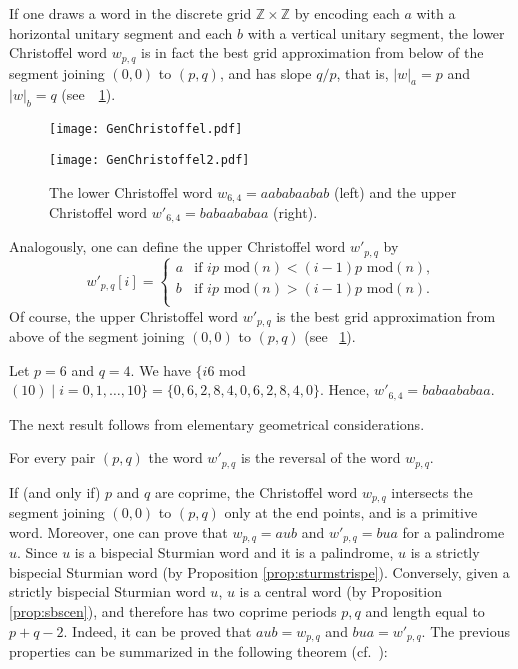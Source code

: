 \documentclass{llncs}
\begin{document}
If one draws a word in the discrete grid $\mathbb{Z} \times \mathbb{Z}$ by encoding each $a$ with a horizontal unitary segment and each $b$ with a vertical unitary segment, the lower Christoffel word $w_{p,q}$ is in fact the best grid approximation from below of the segment joining $(0,0)$ to $(p,q)$, and has slope $q/p$, that is, $|w|_{a}=p$ and  $|w|_{b}=q$ (see~\figurename~\ref{fig:GC}).

\begin{figure}
\begin{center}
\begin{minipage}{5.7cm}
\texttt{[image: GenChristoffel.pdf]}
\end{minipage}
\begin{minipage}{5.7cm}
\texttt{[image: GenChristoffel2.pdf]}
\end{minipage}
\end{center}
\caption{The lower Christoffel word $w_{6,4}=aababaabab$ (left) and the upper Christoffel word $w'_{6,4}=babaababaa$ (right).\label{fig:GC}}
\end{figure}

Analogously, one can define the upper Christoffel word $w'_{p,q}$ by
\[w'_{p,q}[i] = \left\{ \begin{array}{lllll}
a & \mbox{if $ip$ mod$(n)<(i-1)p$ mod$(n)$,}\\
b & \mbox{if $ip$ mod$(n)>(i-1)p$ mod$(n)$.}\\
\end{array} \right.\]
Of course, the upper Christoffel word $w'_{p,q}$ is the best grid approximation from above of the segment joining $(0,0)$ to $(p,q)$ (see \figurename~\ref{fig:GC}).

\begin{example}
 Let $p=6$ and $q=4$. We have $\{i6$ mod$(10)\mid i=0,1,\ldots,10\}=\{0,6,2,8,4,0,6,2,8,4,0\}$. Hence, $w'_{6,4}=babaababaa$.
\end{example}

The next result follows from elementary geometrical considerations.

\begin{lemma}\label{lem:rev}
 For every pair $(p,q)$ the word $w'_{p,q}$ is the reversal of the word $w_{p,q}$.
\end{lemma}

If (and only if) $p$ and $q$ are coprime, the Christoffel word $w_{p,q}$ intersects the segment joining $(0,0)$ to $(p,q)$ only at the end points, and is a primitive word. Moreover, one can prove that $w_{p,q}=aub$ and $w'_{p,q}=bua$ for a palindrome $u$. Since $u$ is a bispecial Sturmian word and it is a palindrome,  $u$ is a strictly bispecial Sturmian word (by Proposition \ref{prop:sturmstrispe}). Conversely, given a strictly bispecial Sturmian word $u$, $u$ is a central word (by Proposition \ref{prop:sbscen}), and therefore has two coprime periods $p,q$ and length equal to $p+q-2$. Indeed, it can be proved that $aub=w_{p,q}$ and $bua=w'_{p,q}$. The previous properties can be summarized in the following theorem (cf.~\cite{BeDel97}):
\end{document}
